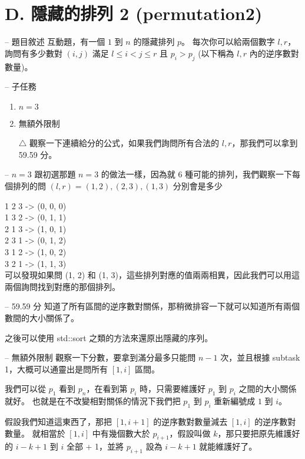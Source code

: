 \documentclass[hyperref,UTF8,notheorems,xcolor={dvipsnames}]{beamer}
\newcommand{\btitle}[1]{{\secname} -- #1}
\theoremstyle{definition}
\begin{document}
\section{D. 隱藏的排列 2 (permutation2)}

\begin{frame}[fragile]{\btitle{題目敘述}}
	互動題，有一個 $1$ 到 $n$ 的隱藏排列 $p$。
	每次你可以給兩個數字 $l, r$，詢問有多少數對 $(i, j)$ 滿足 $l \le i < j \le r$ 且 $p_i > p_j$ (以下稱為 $l, r$ 內的逆序數對數量)。
\end{frame}

\begin{frame}[fragile]{\btitle{子任務}}
	\begin{enumerate}
		\item $n = 3$
		\item 無額外限制
		\item[$\triangle$] 觀察一下連續給分的公式，如果我們詢問所有合法的 $l, r$，那我們可以拿到 59.59 分。
	\end{enumerate}
\end{frame}

\begin{frame}[fragile]{\btitle{$n = 3$}}
	跟初選那題 $n = 3$ 的做法一樣，因為就 6 種可能的排列，我們觀察一下每個排列的問 $(l, r) =  (1, 2), (2, 3), (1, 3)$ 分別會是多少  
	\pause

	1 2 3 -> (0, 0, 0)  \\
	1 3 2 -> (0, 1, 1)  \\
	2 1 3 -> (1, 0, 1)  \\
	2 3 1 -> (0, 1, 2)  \\
	3 1 2 -> (1, 0, 2)  \\
	3 2 1 -> (1, 1, 3)  \\
	可以發現如果問 (1, 2) 和 (1, 3)，這些排列對應的值兩兩相異，因此我們可以用這兩個詢問找到對應的那個排列。
\end{frame}

\begin{frame}[fragile]{\btitle{59.59 分}}
	知道了所有區間的逆序數對關係，那稍微排容一下就可以知道所有兩個數間的大小關係了。
	
	之後可以使用 std::sort 之類的方法來還原出隱藏的序列。

\end{frame}

\begin{frame}[fragile]{\btitle{無額外限制}}
	觀察一下分數，要拿到滿分最多只能問 $n - 1$ 次，並且根據 subtask 1，大概可以通靈出是問所有 $[1, i]$ 區間。
	\pause

	我們可以從 $p_1$ 看到 $p_n$，在看到第 $p_i$ 時，只需要維護好 $p_1$ 到 $p_i$ 之間的大小關係就好。
	也就是在不改變相對關係的情況下我們把 $p_1$ 到 $p_i$ 重新編號成 $1$ 到 $i$。 
	\pause

	假設我們知道這東西了，那把 $[1, i + 1]$ 的逆序數對數量減去 $[1, i]$ 的逆序數對數量。
	就相當於 $[1, i]$ 中有幾個數大於 $p_{i + 1}$，假設叫做 $k$，那只要把原先維護好的 $i - k + 1$ 到 $i$ 全部 + 1，並將 $p_{i + 1}$ 設為 $i - k + 1$ 就能維護好了。
	
\end{frame}
\end{document}
